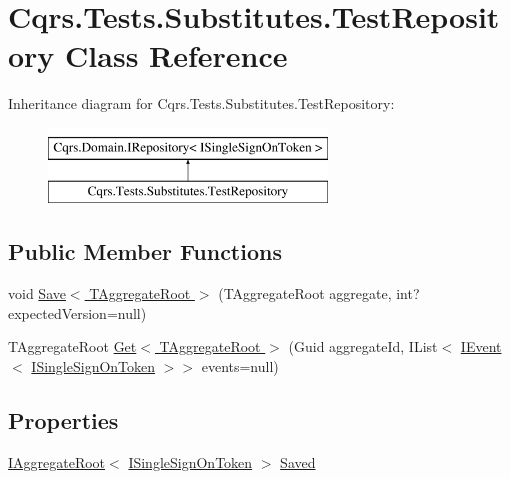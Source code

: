\hypertarget{classCqrs_1_1Tests_1_1Substitutes_1_1TestRepository}{}\section{Cqrs.\+Tests.\+Substitutes.\+Test\+Repository Class Reference}
\label{classCqrs_1_1Tests_1_1Substitutes_1_1TestRepository}
Inheritance diagram for Cqrs.\+Tests.\+Substitutes.\+Test\+Repository\+:\begin{figure}[H]
\begin{center}
\leavevmode
\includegraphics[height=2.000000cm]{classCqrs_1_1Tests_1_1Substitutes_1_1TestRepository}
\end{center}
\end{figure}
\subsection*{Public Member Functions}
\begin{DoxyCompactItemize}
\item 
void \hyperlink{classCqrs_1_1Tests_1_1Substitutes_1_1TestRepository_a8e387f387f4077001298fb78dbba0c45_a8e387f387f4077001298fb78dbba0c45}{Save$<$ T\+Aggregate\+Root $>$} (T\+Aggregate\+Root aggregate, int? expected\+Version=null)
\item 
T\+Aggregate\+Root \hyperlink{classCqrs_1_1Tests_1_1Substitutes_1_1TestRepository_a506da3fc19c405a74237aadbf59ecd6b_a506da3fc19c405a74237aadbf59ecd6b}{Get$<$ T\+Aggregate\+Root $>$} (Guid aggregate\+Id, I\+List$<$ \hyperlink{interfaceCqrs_1_1Events_1_1IEvent}{I\+Event}$<$ \hyperlink{interfaceCqrs_1_1Authentication_1_1ISingleSignOnToken}{I\+Single\+Sign\+On\+Token} $>$$>$ events=null)
\end{DoxyCompactItemize}
\subsection*{Properties}
\begin{DoxyCompactItemize}
\item 
\hyperlink{interfaceCqrs_1_1Domain_1_1IAggregateRoot}{I\+Aggregate\+Root}$<$ \hyperlink{interfaceCqrs_1_1Authentication_1_1ISingleSignOnToken}{I\+Single\+Sign\+On\+Token} $>$ \hyperlink{classCqrs_1_1Tests_1_1Substitutes_1_1TestRepository_ab0948780928642027f86a02c74d010d0_ab0948780928642027f86a02c74d010d0}{Saved}
\end{DoxyCompactItemize}


